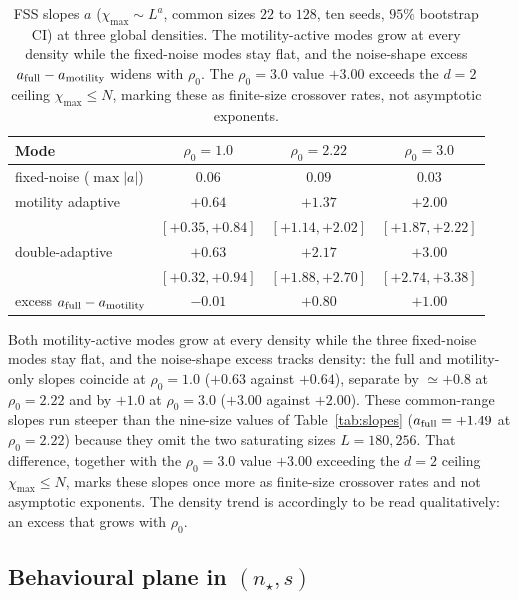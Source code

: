 \documentclass[11pt,a4paper]{article}
\begin{document}
\begin{table}[h]
\centering
\caption{FSS slopes $a$ ($\chi_{\max} \sim L^a$, common sizes
$22$ to $128$, ten seeds, $95\%$ bootstrap CI) at three global
densities. The motility-active modes grow at every density while
the fixed-noise modes stay flat, and the noise-shape excess
$a_{\rm full} - a_{\rm motility}$ widens with $\rho_0$. The
$\rho_0 = 3.0$ value $+3.00$ exceeds the $d = 2$ ceiling
$\chi_{\max} \le N$, marking these as finite-size crossover rates,
not asymptotic exponents.}
\label{tab:density}
\small
\begin{tabular}{l c c c}
\toprule
Mode & $\rho_0 = 1.0$ & $\rho_0 = 2.22$ & $\rho_0 = 3.0$ \\
\midrule
fixed-noise ($\max|a|$) & $0.06$ & $0.09$ & $0.03$ \\
motility adaptive & $+0.64$ & $+1.37$ & $+2.00$ \\
                  & {\scriptsize $[+0.35,+0.84]$} & {\scriptsize $[+1.14,+2.02]$} & {\scriptsize $[+1.87,+2.22]$} \\
double-adaptive   & $+0.63$ & $+2.17$ & $+3.00$ \\
                  & {\scriptsize $[+0.32,+0.94]$} & {\scriptsize $[+1.88,+2.70]$} & {\scriptsize $[+2.74,+3.38]$} \\
\midrule
excess $a_{\rm full}-a_{\rm motility}$ & $-0.01$ & $+0.80$ & $+1.00$ \\
\bottomrule
\end{tabular}
\end{table}

Both motility-active modes grow at every density while the three
fixed-noise modes stay flat, and the noise-shape excess tracks
density: the full and motility-only slopes coincide at
$\rho_0 = 1.0$ ($+0.63$ against $+0.64$), separate by $\simeq +0.8$
at $\rho_0 = 2.22$ and by $+1.0$ at $\rho_0 = 3.0$ ($+3.00$ against
$+2.00$). These common-range slopes run steeper than the nine-size
values of Table~\ref{tab:slopes} ($a_{\rm full} = +1.49$ at
$\rho_0 = 2.22$) because they omit the two saturating sizes
$L = 180, 256$. That difference, together with the
$\rho_0 = 3.0$ value $+3.00$ exceeding the $d = 2$ ceiling
$\chi_{\max} \le N$, marks these slopes once more as finite-size
crossover rates and not asymptotic exponents. The density trend is
accordingly to be read qualitatively: an excess that grows with
$\rho_0$.

\subsection*{\texorpdfstring{Behavioural plane in $(n_\star, s)$}{Behavioural plane}}
\label{sec:supp-plane}
\end{document}
